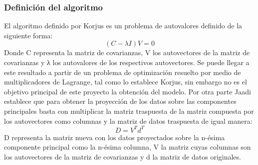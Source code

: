 \documentclass{article}
\begin{document}
\subsubsection{Definición del algoritmo}
El algoritmo definido por Korjus es un problema de autovalores definido de la siguiente forma: 
\[(C   -   \lambda I) V = 0\]
Donde C representa la matriz de covarianzas, V los autovectores de la matriz de covarianzas y λ los autovalores de los respectivos autovectores.
Se puede llegar a este resultado a partir de un problema de optimización resuelto por medio de multiplicadores de Lagrange, tal como lo establece Korjus, sin embargo no es el objetivo principal de este proyecto la obtención del modelo.
Por otra parte Jaadi establece que para obtener la proyección de los datos sobre las componentes principales basta con multiplicar la matriz traspuesta de la matriz compuesta por los autovectores como columnas y la matriz de datos traspuesta de igual manera:
\[D=V^{T}d^{T}\]
D representa la matriz nueva con los datos proyectados sobre la n-ésima componente principal como la n-ésima columna, V la matriz cuyas columnas son los autovectores de la matriz de covarianzas y d la matriz de datos originales.
\end{document}
